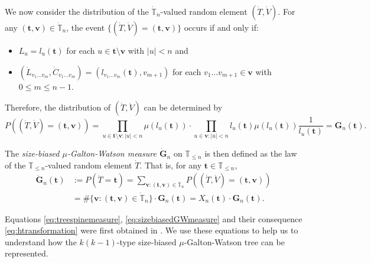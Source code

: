 \documentclass[12pt,a4paper]{amsart}
\numberwithin{equation}{section}
\begin{document}
	We now consider the distribution of the $\dot{\mathbb T}_n$-valued random element $(\dot T,\dot V)$.
	For any $( \mathbf t , \mathbf v)\in\dot{\mathbb T}_n$, the event $\{(\dot T,\dot V)=( \mathbf t , \mathbf v)\}$ occurs if and only if:
\begin{itemize}
\item
    $L_u=l_u( \mathbf t )$ for each $u\in  \mathbf t \setminus \mathbf v$ with $| u |<n$ and
\item
	$(\dot L_{v_1\dots v_m},\dot C_{v_1\dots v_m})=(l_{v_1\dots v_m}( \mathbf t ),v_{m+1})$ for each $v_1\dots v_{m+1}\in \mathbf v$ with $0\le m\le n-1$.
\end{itemize}
    Therefore, the distribution of $(\dot T,\dot V)$ can be determined by
\begin{equation}
\label{eq:treespinemeasure}
		P((\dot T,\dot V)=( \mathbf t , \mathbf v))
	=\prod_{u\in  \mathbf t \setminus \mathbf v:|u|<n}\mu(l_u( \mathbf t ))
	\cdot \prod_{u\in  \mathbf v:| u| <n}l_u( \mathbf t )\mu(l_u( \mathbf t ))\frac{1}{l_u( \mathbf t )}
	= \mathbf G_n( \mathbf t ).
\end{equation}
	
	The \emph{size-biased $\mu$-Galton-Watson measure $\dot {\mathbf G}_n$} on $\mathbb T_{\leq n}$ is then defined as the law of the $\mathbb T_{\leq n}$-valued random element $\dot T$. That is, for any $ \mathbf t \in\mathbb T_{\leq n}$,
\begin{equation}
\label{eq:sizebiasedGWmeasure}
\begin{split}
		\dot {\mathbf G}_n( \mathbf t )
	&:= P(\dot T= \mathbf t )
	= \sum_{ \mathbf v:( \mathbf t , \mathbf v)\in \dot{\mathbb T}_n} P((\dot T,\dot V)=( \mathbf t , \mathbf v))
	\\&= \#\{ \mathbf v:( \mathbf t , \mathbf v)\in \dot{\mathbb T}_n\} \cdot \mathbf G_n( \mathbf t )
	= X_n( \mathbf t ) \cdot \mathbf G_n( \mathbf t ).
\end{split}
\end{equation}

	Equations \eqref{eq:treespinemeasure}, \eqref{eq:sizebiasedGWmeasure} and their consequence \eqref{eq:htransformation} were first obtained in \cite{lyons1995conceptual}.
	We use these equations to help us to understand how the $k(k-1)$-type size-biased $\mu$-Galton-Watson tree can be represented.
	
\end{document}
